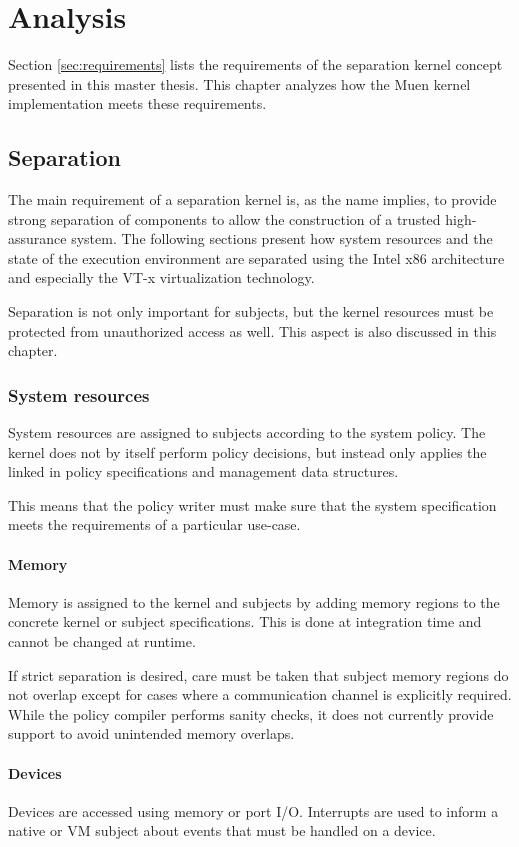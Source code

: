 \chapter{Analysis}
Section \ref{sec:requirements} lists the requirements of the separation kernel
concept presented in this master thesis. This chapter analyzes how the
Muen kernel implementation meets these requirements.

\section{Separation}
The main requirement of a separation kernel is, as the name implies, to provide
strong separation of components to allow the construction of a trusted
high-assurance system. The following sections present how system resources and
the state of the execution environment are separated using the Intel x86
architecture and especially the VT-x virtualization technology.

Separation is not only important for subjects, but the kernel resources must be
protected from unauthorized access as well. This aspect is also discussed in
this chapter.

\subsection{System resources}
System resources are assigned to subjects according to the system policy. The
kernel does not by itself perform policy decisions, but instead only applies
the linked in policy specifications and management data structures.

This means that the policy writer must make sure that the system specification
meets the requirements of a particular use-case.

\subsubsection{Memory}
Memory is assigned to the kernel and subjects by adding memory regions to the
concrete kernel or subject specifications. This is done at integration time and
cannot be changed at runtime.

If strict separation is desired, care must be taken that subject memory regions
do not overlap except for cases where a communication channel is explicitly
required. While the policy compiler performs sanity checks, it does not
currently provide support to avoid unintended memory overlaps.

\subsubsection{Devices}
Devices are accessed using memory or port I/O. Interrupts are used to inform a
native or VM subject about events that must be handled on a device.

